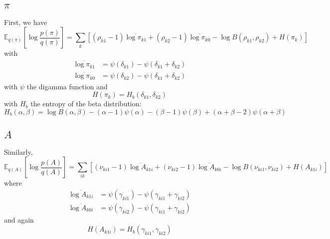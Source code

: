 \documentclass[11pt]{article}
\begin{document}
\subsection{$\pi$}
First, we have
\begin{equation}
    \mathbb{E}_{q(\pi)} \left[\log \frac{p(\pi)}{q(\pi)} \right] = \sum_k \left[(\rho_{k1} - 1)\overline{\log \pi_{k1}} + (\rho_{k2} - 1) \overline{\log \pi_{k0}} - \log B(\rho_{k1}, \rho_{k2}) + H(\pi_k) \right]
\end{equation}
with
\begin{align}
    \overline{\log \pi_{k1}} &= \psi(\delta_{k1}) - \psi(\delta_{k1} + \delta_{k2}) \\
    \overline{\log \pi_{k0}} &= \psi(\delta_{k2}) - \psi(\delta_{k1} + \delta_{k2})
\end{align}
with $\psi$ the digamma function and 
\begin{equation}
    H(\pi_k) = H_b(\delta_{k1}, \delta_{k2})
\end{equation}
with $H_b$ the entropy of the beta distribution:
\begin{equation}
    H_b(\alpha, \beta) = \log B(\alpha, \beta) - (\alpha - 1) \psi(\alpha) - (\beta - 1) \psi(\beta) + (\alpha + \beta - 2)\psi(\alpha + \beta)
\end{equation}

\subsection{$A$} 
Similarly,
\begin{equation}
    \mathbb{E}_{q(A)} \left[\log \frac{p(A)}{q(A)} \right] = 
\sum_{ik} \left[ (\nu_{ki1} - 1) \overline{\log A_{k1i}} + (\nu_{ki2} - 1) \overline{\log A_{k0i}} - \log B(\nu_{ki1}, \nu_{ki2}) + H(A_{k1i}) \right]
\end{equation}
where 
\begin{align}
    \overline{\log A_{k1i}} &= \psi(\gamma_{ki1}) - \psi(\gamma_{ki1} + \gamma_{ki2}) \\
    \overline{\log A_{k0i}} &= \psi(\gamma_{ki2}) - \psi(\gamma_{ki1} + \gamma_{ki2})
\end{align}
and again
\begin{equation}
    H(A_{k1i}) = H_b(\gamma_{ki1}, \gamma_{ki2})
\end{equation}
\end{document}

